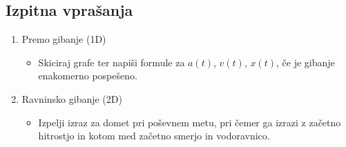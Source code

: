 \newpage
\subsection*{Izpitna vprašanja}
\begin{enumerate}
    \item Premo gibanje (1D)
    \begin{itemize}
        \item Skiciraj grafe ter napiši formule za \(a(t)\), \(v(t)\), \(x(t)\), če je gibanje enakomerno pospešeno.
    \end{itemize}

    \item Ravninsko gibanje (2D)
    
    \begin{itemize}
        \item Izpelji izraz za domet pri poševnem metu, pri čemer ga izrazi z začetno hitrostjo in kotom med začetno smerjo in vodoravnico.
    \end{itemize}
\end{enumerate}